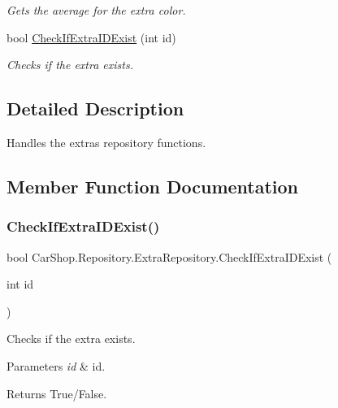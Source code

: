 \begin{DoxyCompactItemize}
\begin{DoxyCompactList}\small\item\em Gets the average for the extra color. \end{DoxyCompactList}\item 
bool \mbox{\hyperlink{class_car_shop_1_1_repository_1_1_extra_repository_ab50b602e032ffe351ff2e823e7de75f6}{Check\+If\+Extra\+I\+D\+Exist}} (int id)
\begin{DoxyCompactList}\small\item\em Checks if the extra exists. \end{DoxyCompactList}\end{DoxyCompactItemize}


\subsection{Detailed Description}
Handles the extra\textquotesingle{}s repository functions. 



\subsection{Member Function Documentation}
\mbox{\label{class_car_shop_1_1_repository_1_1_extra_repository_ab50b602e032ffe351ff2e823e7de75f6}} 
\subsubsection{\texorpdfstring{Check\+If\+Extra\+I\+D\+Exist()}{CheckIfExtraIDExist()}}
{\footnotesize\ttfamily bool Car\+Shop.\+Repository.\+Extra\+Repository.\+Check\+If\+Extra\+I\+D\+Exist (\begin{DoxyParamCaption}\item[{int}]{id }\end{DoxyParamCaption})}



Checks if the extra exists. 


\begin{DoxyParams}{Parameters}
{\em id} & id.\\
\hline
\end{DoxyParams}
\begin{DoxyReturn}{Returns}
True/\+False.
\end{DoxyReturn}
\mbox{\label{class_car_shop_1_1_repository_1_1_extra_repository_ac89e3ff578a01c619c5767a2f10e45fb}} 
